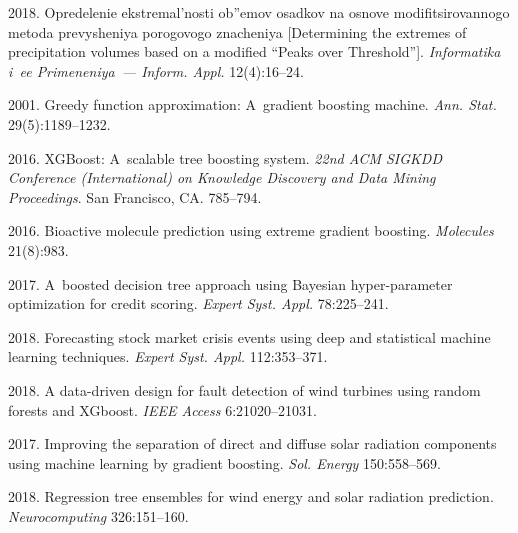   \begin{multicols}{2}

\renewcommand{\bibname}{\protect\rmfamily References}

{\small\frenchspacing
 {%
 \begin{thebibliography}{99}
 2018. {Opredelenie ekstremal'nosti ob''emov osadkov na osnove 
 mo\-di\-fi\-tsi\-ro\-van\-no\-go metoda prevysheniya porogovogo znacheniya} 
 [Determining the extremes of precipitation volumes  based on a modified ``Peaks
  over Threshold'']. \textit{Informatika i~ee  Primeneniya~--- Inform. Appl.} 
  12(4):16--24. 

 2001.
 Greedy function approximation: A~gradient boosting machine. 
 \textit{Ann. Stat.} 29(5):1189--1232.

 2016. XGBoost: A~scalable tree boosting system. 
\textit{22nd ACM SIGKDD  Conference (International) on Knowledge Discovery 
and Data Mining Proceedings}. San Francisco, CA. 785--794.

 2016. 
Bioactive molecule prediction using extreme gradient boosting. 
\textit{Molecules} 21(8):983.

2017. A~boosted decision tree approach using Bayesian hyper-parameter optimization 
for credit scoring. \textit{Expert Syst. Appl.} 78:225--241.

 2018. Forecasting stock market crisis events 
using deep and statistical machine learning techniques. 
\textit{Expert Syst. Appl.} 112:353--371.

 2018. A data-driven design for fault detection of wind turbines 
 using random forests and XGboost. 
 \textit{IEEE Access} 6:21020--21031.

 2017. Improving the separation of direct and diffuse solar radiation 
 components using machine learning by gradient boosting. 
 \textit{Sol. Energy} 150:558--569.

2018. Regression tree ensembles for wind energy and solar radiation prediction. 
\textit{Neurocomputing} 326:151--160.


\end{thebibliography}}}
\end{multicols}
